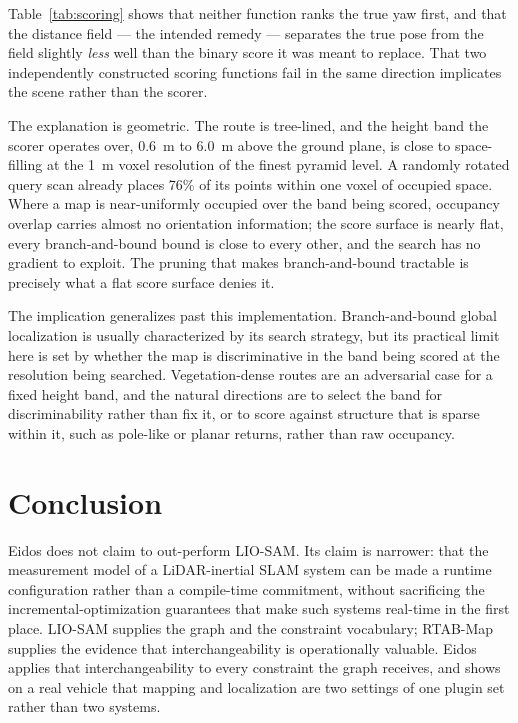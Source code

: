 \documentclass[conference]{IEEEtran}
\begin{document}
Table~\ref{tab:scoring} shows that neither function ranks the true yaw first, and that the
distance field --- the intended remedy --- separates the true pose from the field slightly
\emph{less} well than the binary score it was meant to replace. That two independently
constructed scoring functions fail in the same direction implicates the scene rather than the
scorer.

The explanation is geometric. The route is tree-lined, and the height band the scorer operates
over, 0.6~m to 6.0~m above the ground plane, is close to space-filling at the 1~m voxel
resolution of the finest pyramid level. A randomly rotated query scan already places 76\% of its
points within one voxel of occupied space. Where a map is near-uniformly occupied over the band
being scored, occupancy overlap carries almost no orientation information; the score surface is
nearly flat, every branch-and-bound bound is close to every other, and the search has no gradient
to exploit. The pruning that makes branch-and-bound tractable is precisely what a flat score
surface denies it.

The implication generalizes past this implementation. Branch-and-bound global localization is
usually characterized by its search strategy, but its practical limit here is set by whether the
map is discriminative in the band being scored at the resolution being searched. Vegetation-dense
routes are an adversarial case for a fixed height band, and the natural directions are to select
the band for discriminability rather than fix it, or to score against structure that is sparse
within it, such as pole-like or planar returns, rather than raw occupancy.

\section{Conclusion}
Eidos does not claim to out-perform LIO-SAM. Its claim is narrower: that the measurement model of a LiDAR-inertial SLAM system can be made a runtime configuration rather than a compile-time commitment, without sacrificing the incremental-optimization guarantees that make such systems real-time in the first place. LIO-SAM supplies the graph and the constraint vocabulary; RTAB-Map supplies the evidence that interchangeability is operationally valuable. Eidos applies that interchangeability to every constraint the graph receives, and shows on a real vehicle that mapping and localization are two settings of one plugin set rather than two systems.

\printbibliography
\end{document}
